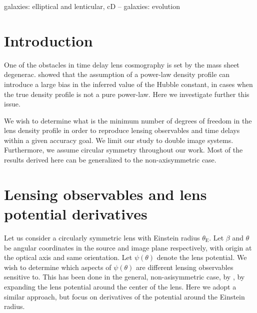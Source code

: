 \documentclass[usenatbib]{mnras}
\def\tein{\theta_{\mathrm{E}}}
\begin{document}
\begin{keywords}
   galaxies: elliptical and lenticular, cD -- galaxies: evolution
\end{keywords}

\section{Introduction}\label{sect:intro}

One of the obstacles in time delay lens cosmography is set by the mass sheet degenerac.
\citet{S+S13} showed that the assumption of a power-law density profile can introduce a large bias in the inferred value of the Hubble constant, in cases when the true density profile is not a pure power-law.
Here we investigate further this issue.

We wish to determine what is the minimum number of degrees of freedom in the lens density profile in order to reproduce lensing observables and time delays within a given accuracy goal.
We limit our study to double image systems. Furthermore, we assume circular symmetry throughout our work. Most of the results derived here can be generalized to the non-axisymmetric case.

\section{Lensing observables and lens potential derivatives}\label{sect:pot}

Let us consider a circularly symmetric lens with Einstein radius $\tein$.
Let $\beta$ and $\theta$ be angular coordinates in the source and image plane respectively, with origin at the optical axis and same orientation.
Let $\psi(\theta)$ denote the lens potential.
We wish to determine which aspects of $\psi(\theta)$ are different lensing observables sensitive to.
This has been done in the general, non-asisymmetric case, by \cite{W+B16}, by expanding the lens potential around the center of the lens.
Here we adopt a similar approach, but focus on derivatives of the potential around the Einstein radius.
\end{document}
